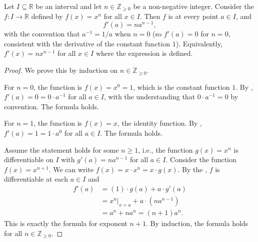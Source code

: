 \begin{proposition} \label{proposition:derivative_of_a_power_function_on_a_real_interval_for_natural_exponents}
    Let $I \subseteq \mathbb{R}$ be an interval and let $n \in \mathbb{Z}_{\ge 0}$ be a non-negative integer. Consider the  $f : I \to \mathbb{R}$ defined by $f(x) = x^n$ for all $x \in I$. Then $f$ is  at every point $a \in I$, and
    $$f'(a) = n a^{n-1},$$
    with the convention that $a^{-1} = 1/a$ when $n=0$ (so $f'(a) = 0$ for $n=0$, consistent with the derivative of the constant function $1$).
    Equivalently, $f'(x) = n x^{n-1}$ for all $x \in I$ where the expression is defined.
\end{proposition}
\begin{proof}
    We prove this by induction on $n \in \mathbb{Z}_{\ge 0}$.

    For $n = 0$, the function is $f(x) = x^0 = 1$, which is the constant function $1$. By , $f'(a) = 0 = 0 \cdot a^{-1}$ for all $a \in I$, with the understanding that $0 \cdot a^{-1} = 0$ by convention. The formula holds.

    For $n = 1$, the function is $f(x) = x$, the identity function. By , $f'(a) = 1 = 1 \cdot a^0$ for all $a \in I$. The formula holds.

    Assume the statement holds for some $n \ge 1$, i.e., the function $g(x) = x^n$ is differentiable on $I$ with $g'(a) = n a^{n-1}$ for all $a \in I$. Consider the function $f(x) = x^{n+1}$. We can write $f(x) = x \cdot x^n = x \cdot g(x)$. By the , $f$ is differentiable at each $a \in I$ and
    \begin{align*}
        f'(a) &= (1) \cdot g(a) + a \cdot g'(a) \\
        &= x^n \big|_{x=a} + a \cdot (n a^{n-1}) \\
        &= a^n + n a^n = (n+1) a^n.
    \end{align*}
    This is exactly the formula for exponent $n+1$. By induction, the formula holds for all $n \in \mathbb{Z}_{\ge 0}$.
\end{proof}